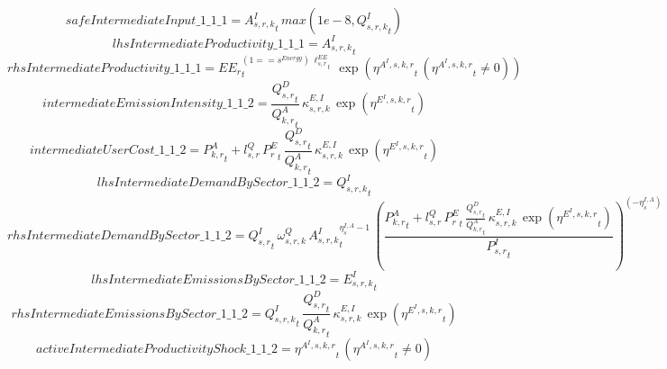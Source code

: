 \begin{dmath*}
safeIntermediateInput\_1\_1\_1 = {{A^{I}_{s,r,k}}}_{t}\, max(1e-8,{{Q^{I}_{s,r,k}}}_{t})
\end{dmath*}
\begin{dmath*}
lhsIntermediateProductivity\_1\_1\_1 = {{A^{I}_{s,r,k}}}_{t}
\end{dmath*}
\begin{dmath*}
rhsIntermediateProductivity\_1\_1\_1 = {{EE_r}}_{t}^{\left(1=={{s^{Energy}}}\right)\, {{\ell^{EE}_{s,r}}}_{t}}\, \exp\left({{\eta^{A^{I},s,k,r}}}_{t}\, \left({{\eta^{A^{I},s,k,r}}}_{t}\neq 0\right)\right)
\end{dmath*}
\begin{dmath*}
intermediateEmissionIntensity\_1\_1\_2 = \frac{{{Q^{D}_{s,r}}}_{t}}{{{Q^{A}_{k,r}}}_{t}}\, {{\kappa^{E,I}_{s,r,k}}}\, \exp\left({{\eta^{E^{I},s,k,r}}}_{t}\right)
\end{dmath*}
\begin{dmath*}
intermediateUserCost\_1\_1\_2 = {{P^{A}_{k,r}}}_{t}+{{l^{Q}_{s,r}}}\, {{P^E_r}}_{t}\, \frac{{{Q^{D}_{s,r}}}_{t}}{{{Q^{A}_{k,r}}}_{t}}\, {{\kappa^{E,I}_{s,r,k}}}\, \exp\left({{\eta^{E^{I},s,k,r}}}_{t}\right)
\end{dmath*}
\begin{dmath*}
lhsIntermediateDemandBySector\_1\_1\_2 = {{Q^{I}_{s,r,k}}}_{t}
\end{dmath*}
\begin{dmath*}
rhsIntermediateDemandBySector\_1\_1\_2 = {{Q^{I}_{s,r}}}_{t}\, {{\omega^{Q}_{s,r,k}}}\, {{A^{I}_{s,r,k}}}_{t}^{{{\eta^{I,A}_{s}}}-1}\, \left(\frac{{{P^{A}_{k,r}}}_{t}+{{l^{Q}_{s,r}}}\, {{P^E_r}}_{t}\, \frac{{{Q^{D}_{s,r}}}_{t}}{{{Q^{A}_{k,r}}}_{t}}\, {{\kappa^{E,I}_{s,r,k}}}\, \exp\left({{\eta^{E^{I},s,k,r}}}_{t}\right)}{{{P^{I}_{s,r}}}_{t}}\right)^{\left(-{{\eta^{I,A}_{s}}}\right)}
\end{dmath*}
\begin{dmath*}
lhsIntermediateEmissionsBySector\_1\_1\_2 = {{E^I_{s,r,k}}}_{t}
\end{dmath*}
\begin{dmath*}
rhsIntermediateEmissionsBySector\_1\_1\_2 = {{Q^{I}_{s,r,k}}}_{t}\, \frac{{{Q^{D}_{s,r}}}_{t}}{{{Q^{A}_{k,r}}}_{t}}\, {{\kappa^{E,I}_{s,r,k}}}\, \exp\left({{\eta^{E^{I},s,k,r}}}_{t}\right)
\end{dmath*}
\begin{dmath*}
activeIntermediateProductivityShock\_1\_1\_2 = {{\eta^{A^{I},s,k,r}}}_{t}\, \left({{\eta^{A^{I},s,k,r}}}_{t}\neq 0\right)
\end{dmath*}
